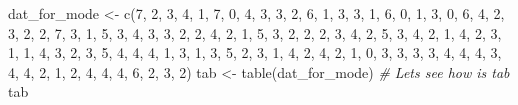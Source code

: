 \documentclass[
]{book}
\newenvironment{Shaded}{\begin{snugshade}}{\end{snugshade}}
\newcommand{\CommentTok}[1]{\textcolor[rgb]{0.56,0.35,0.01}{\textit{#1}}}
\newcommand{\DecValTok}[1]{\textcolor[rgb]{0.00,0.00,0.81}{#1}}
\newcommand{\FunctionTok}[1]{\textcolor[rgb]{0.00,0.00,0.00}{#1}}
\newcommand{\NormalTok}[1]{#1}
\newcommand{\OtherTok}[1]{\textcolor[rgb]{0.56,0.35,0.01}{#1}}
\begin{document}
\begin{Shaded}
\begin{Highlighting}[]
\NormalTok{dat\_for\_mode }\OtherTok{\textless{}{-}} \FunctionTok{c}\NormalTok{(}\DecValTok{7}\NormalTok{, }\DecValTok{2}\NormalTok{, }\DecValTok{3}\NormalTok{, }\DecValTok{4}\NormalTok{, }\DecValTok{1}\NormalTok{, }\DecValTok{7}\NormalTok{, }\DecValTok{0}\NormalTok{, }\DecValTok{4}\NormalTok{, }\DecValTok{3}\NormalTok{, }\DecValTok{3}\NormalTok{, }\DecValTok{2}\NormalTok{, }\DecValTok{6}\NormalTok{, }\DecValTok{1}\NormalTok{, }\DecValTok{3}\NormalTok{, }\DecValTok{3}\NormalTok{, }\DecValTok{1}\NormalTok{, }\DecValTok{6}\NormalTok{, }\DecValTok{0}\NormalTok{, }\DecValTok{1}\NormalTok{, }\DecValTok{3}\NormalTok{, }\DecValTok{0}\NormalTok{, }\DecValTok{6}\NormalTok{, }\DecValTok{4}\NormalTok{, }\DecValTok{2}\NormalTok{, }\DecValTok{3}\NormalTok{, }\DecValTok{2}\NormalTok{, }\DecValTok{2}\NormalTok{, }\DecValTok{7}\NormalTok{, }\DecValTok{3}\NormalTok{, }\DecValTok{1}\NormalTok{, }\DecValTok{5}\NormalTok{, }\DecValTok{3}\NormalTok{, }\DecValTok{4}\NormalTok{, }\DecValTok{3}\NormalTok{, }\DecValTok{3}\NormalTok{, }\DecValTok{2}\NormalTok{, }\DecValTok{2}\NormalTok{, }\DecValTok{4}\NormalTok{, }\DecValTok{2}\NormalTok{, }\DecValTok{1}\NormalTok{, }\DecValTok{5}\NormalTok{, }\DecValTok{3}\NormalTok{, }\DecValTok{2}\NormalTok{, }\DecValTok{2}\NormalTok{, }\DecValTok{2}\NormalTok{, }\DecValTok{3}\NormalTok{, }\DecValTok{4}\NormalTok{, }\DecValTok{2}\NormalTok{, }\DecValTok{5}\NormalTok{, }\DecValTok{3}\NormalTok{, }\DecValTok{4}\NormalTok{, }\DecValTok{2}\NormalTok{, }\DecValTok{1}\NormalTok{, }\DecValTok{4}\NormalTok{, }\DecValTok{2}\NormalTok{, }\DecValTok{3}\NormalTok{, }\DecValTok{1}\NormalTok{, }\DecValTok{1}\NormalTok{, }\DecValTok{4}\NormalTok{, }\DecValTok{3}\NormalTok{, }\DecValTok{2}\NormalTok{, }\DecValTok{3}\NormalTok{, }\DecValTok{5}\NormalTok{, }\DecValTok{4}\NormalTok{, }\DecValTok{4}\NormalTok{, }\DecValTok{4}\NormalTok{, }\DecValTok{1}\NormalTok{, }\DecValTok{3}\NormalTok{, }\DecValTok{1}\NormalTok{, }\DecValTok{3}\NormalTok{, }\DecValTok{5}\NormalTok{, }\DecValTok{2}\NormalTok{, }\DecValTok{3}\NormalTok{, }\DecValTok{1}\NormalTok{, }\DecValTok{4}\NormalTok{, }\DecValTok{2}\NormalTok{, }\DecValTok{4}\NormalTok{, }\DecValTok{2}\NormalTok{, }\DecValTok{1}\NormalTok{, }\DecValTok{0}\NormalTok{, }\DecValTok{3}\NormalTok{, }\DecValTok{3}\NormalTok{, }\DecValTok{3}\NormalTok{, }\DecValTok{3}\NormalTok{, }\DecValTok{4}\NormalTok{, }\DecValTok{4}\NormalTok{, }\DecValTok{4}\NormalTok{, }\DecValTok{3}\NormalTok{, }\DecValTok{4}\NormalTok{, }\DecValTok{4}\NormalTok{, }\DecValTok{2}\NormalTok{, }\DecValTok{1}\NormalTok{, }\DecValTok{2}\NormalTok{, }\DecValTok{4}\NormalTok{, }\DecValTok{4}\NormalTok{, }\DecValTok{4}\NormalTok{, }\DecValTok{6}\NormalTok{, }\DecValTok{2}\NormalTok{, }\DecValTok{3}\NormalTok{, }\DecValTok{2}\NormalTok{)}
\NormalTok{tab }\OtherTok{\textless{}{-}} \FunctionTok{table}\NormalTok{(dat\_for\_mode)}
\CommentTok{\# Let\textquotesingle{}s see how is tab}
\NormalTok{tab}
\end{Highlighting}
\end{Shaded}
\end{document}

